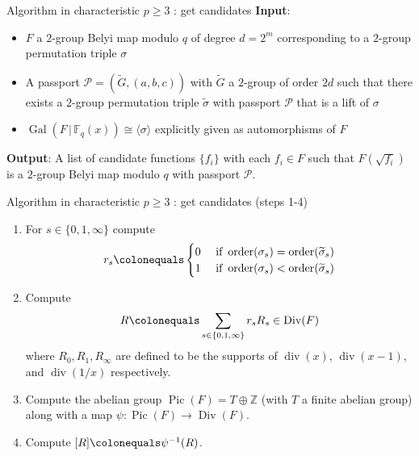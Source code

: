 \documentclass[xcolor=dvipsnames]{beamer}
\theoremstyle{plain}
\newcommand{\ZZ}{\mathbb Z}
\newcommand{\wt}[1]{\widetilde{#1}}
\newcommand{\FF}{\mathbb{F}}
\DeclareMathOperator{\Div}{Div}
\DeclareMathOperator{\Pic}{Pic}
\DeclareMathOperator{\ddiv}{div}
\DeclareMathOperator{\order}{order}
\DeclareMathOperator{\Gal}{Gal}
\begin{document}
  \begin{frame}{Algorithm in characteristic $p\geq 3$ : get candidates}
    \textbf{Input}:
    \begin{itemize}
      \item 
        $F$
        a $2$-group Belyi map modulo $q$
        of degree $d=2^m$
        corresponding to a $2$-group
        permutation triple $\sigma$
      \item
        A passport
        $\mathcal{P}=(\wt{G},(a,b,c))$
        with $\wt{G}$ a $2$-group of order
        $2d$ such that there
        exists a
        $2$-group permutation triple
        $\wt{\sigma}$ with passport
        $\mathcal{P}$
        that is a lift of
        $\sigma$
      \item
        $\Gal(F\,|\,\FF_q(x))\cong
        \langle\sigma\rangle$
        explicitly given
        as automorphisms of $F$
    \end{itemize}
    \textbf{Output}:
    A list of candidate functions
    $\{f_i\}$ with each $f_i\in F$
    such that $F(\sqrt{f_i})$ is a
    $2$-group Belyi map modulo $q$
    with passport $\mathcal{P}$.
  \end{frame}
  \begin{frame}{Algorithm in characteristic $p\geq 3$ : get candidates (steps 1-4)}
    \begin{enumerate}
      \item[1.]
        For $s\in\{0,1,\infty\}$
        compute
        \begin{align*}
          r_s\colonequals
          \begin{cases}
            0&
            \text{ if }
            \order(\sigma_s)=
            \order(\wt{\sigma}_s)\\
            1&
            \text{ if }
            \order(\sigma_s)<
            \order(\wt{\sigma}_s)\\
          \end{cases}
        \end{align*}
      \item[2.]
        Compute
        \begin{equation*}
          R\colonequals
          \sum_{s\in\{0,1,\infty\}}r_sR_s
          \in\Div(F)
        \end{equation*}
        where
        $R_0,R_1,R_\infty$
        are defined to be the supports
        of
        $\ddiv(x)$,
        $\ddiv(x-1)$,
        and $\ddiv(1/x)$
        respectively.
      \item[3.]
        Compute the abelian group
        $\Pic(F)=T\oplus\ZZ$
        (with $T$ a finite abelian group)
        along with a map
        $\psi\colon\Pic(F)\to\Div(F)$.
      \item[4.]
        Compute
        $[R]\colonequals\psi^{-1}(R)$.
    \end{enumerate}
  \end{frame}
\end{document}
